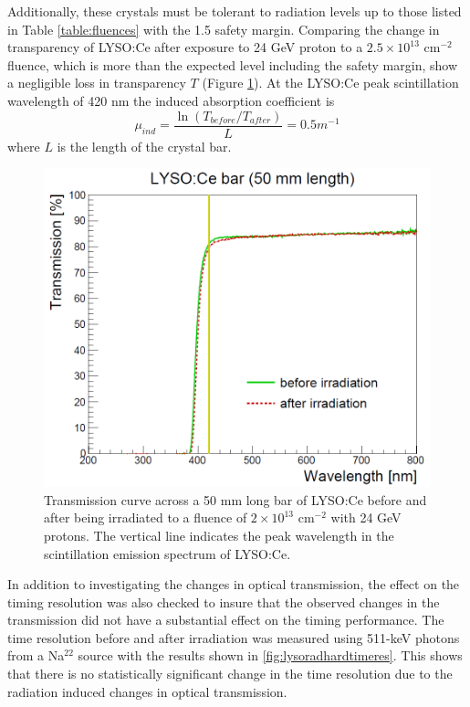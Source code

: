 Additionally, these crystals must be tolerant to radiation levels up to those listed in Table \ref{table:fluences} with the 1.5 safety margin.  Comparing the change in transparency of LYSO:Ce after exposure to 24 GeV proton to a $2.5 \times 10^{13}$ cm$^{-2}$ fluence, which is more than the expected level including the safety margin, show a negligible loss in transparency $T$ (Figure \ref{fig:lysoradiationhard}).  At the LYSO:Ce peak scintillation wavelength of 420 nm the induced absorption coefficient is 
\begin{equation}
	\mu_{ind} = \frac{\ln(T_{before}/T_{after})}{L} = 0.5 m^{-1}
\end{equation}
where $L$ is the length of the crystal bar.
\begin{figure}[h]
	\centering
	\includegraphics[width=1.0\linewidth]{Figures/LYSO_radiationhard}
	\caption[Transmission curve for LYSO:Ce before and after being irradiated to a fluence of $2 \times 10^{13}$ cm$^{-2}$ with 24 GeV protons.]{Transmission curve across a 50 mm long bar of LYSO:Ce before and after being irradiated to a fluence of $2 \times 10^{13}$ cm$^{-2}$ with 24 GeV protons.  The vertical line indicates the peak wavelength in the scintillation emission spectrum of LYSO:Ce.}
	\label{fig:lysoradiationhard}
\end{figure}
In addition to investigating the changes in optical transmission, the effect on the timing resolution was also checked to insure that the observed changes in the transmission did not have a substantial effect on the timing performance.  The time resolution before and after irradiation was measured using 511-keV photons from a Na$^{22}$ source with the results shown in \ref{fig:lysoradhardtimeres}.  This shows that there is no statistically significant change in the time resolution due to the radiation induced changes in optical transmission.  


